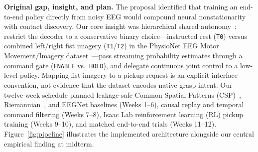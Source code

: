 \documentclass{article}
\begin{document}
\textbf{Original gap, insight, and plan.} The proposal identified that training an end-to-end policy directly from noisy EEG would compound neural nonstationarity with contact discovery. Our core insight was hierarchical shared autonomy~\citep{akinola2017}: restrict the decoder to a conservative binary choice---instructed rest (\texttt{T0}) versus combined left/right fist imagery (\texttt{T1}/\texttt{T2}) in the PhysioNet EEG Motor Movement/Imagery dataset~\citep{schalk2009}---pass streaming probability estimates through a command gate (\texttt{ENABLE} vs.\ \texttt{HOLD}), and delegate continuous joint control to a low-level policy. Mapping fist imagery to a pickup request is an explicit interface convention, not evidence that the dataset encodes native grasp intent. Our twelve-week schedule planned leakage-safe Common Spatial Patterns (CSP)~\citep{blankertz2008}, Riemannian~\citep{barachant2012}, and EEGNet baselines (Weeks 1--6), causal replay and temporal command filtering (Weeks 7--8), Isaac Lab reinforcement learning (RL) pickup training (Weeks 9--10), and matched end-to-end trials (Weeks 11--12). Figure~\ref{fig:pipeline} illustrates the implemented architecture alongside our central empirical finding at midterm.
\end{document}
